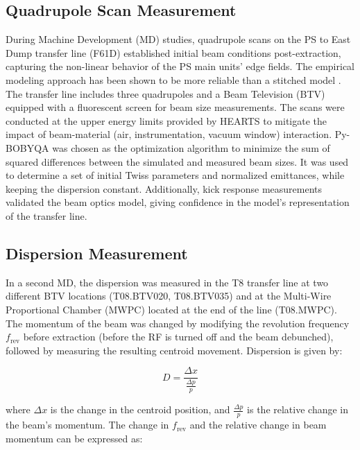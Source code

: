\documentclass[a4paper,
               biblatex,     %
               ]{jacow}
\begin{document}
\subsection{Quadrupole Scan Measurement}

During Machine Development (MD) studies, quadrupole scans on the PS to East Dump transfer line (F61D) established initial beam conditions post-extraction, capturing the non-linear behavior of the PS main units' edge fields. The empirical modeling approach has been shown to be more reliable than a stitched model \cite{johnson_beam_2022}. The transfer line includes three quadrupoles and a Beam Television (BTV) equipped with a fluorescent screen for beam size measurements. The scans were conducted at the upper energy limits provided by HEARTS to mitigate the impact of beam-material (air, instrumentation, vacuum window) interaction. Py-BOBYQA \cite{cartis_escaping_2022, cartis_improving_2019} was chosen as the optimization algorithm to minimize the sum of squared differences between the simulated and measured beam sizes. It was used to determine a set of initial Twiss parameters and normalized emittances, while keeping the dispersion constant. Additionally, kick response measurements validated the beam optics model, giving confidence in the model's representation of the transfer line.



\subsection{Dispersion Measurement}

In a second MD, the dispersion was measured in the T8 transfer line at two different BTV locations (T08.BTV020, T08.BTV035) and at the Multi-Wire Proportional Chamber (MWPC) located at the end of the line (T08.MWPC). The momentum of the beam was changed by modifying the revolution frequency $f_{\text{rev}}$ before extraction (before the RF is turned off and the beam debunched), followed by measuring the resulting centroid movement. Dispersion is given by:

\begin{equation}
D = \frac{\Delta x}{\frac{\Delta p}{p}}
\end{equation}

\noindent where $\Delta x$ is the change in the centroid position, and $\frac{\Delta p}{p}$ is the relative change in the beam's momentum. The change in $f_{\text{rev}}$ and the relative change in beam momentum can be expressed as:
\end{document}
